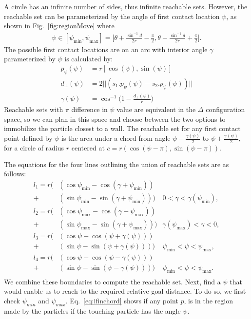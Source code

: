 A circle has an infinite number of sides, thus infinite reachable sets. However, the reachable set can be parameterized by the angle of first contact location $\psi$, as shown in Fig.~\ref{fig:regionMove} where 
\begin{align}
 \psi \in [\psi_{\min}, \psi_{\max}]= \Big[\theta +\frac{\sin^{-1}{d}}{2r} - \frac{\pi}{2}, \theta -\frac{\sin^{-1}{d}}{2r} + \frac{\pi}{2}\Big].
\end{align}
The possible first contact locations are on an arc with interior angle $\gamma$ parameterized by $\psi$ is calculated by:
\begin{align}\label{eq:ppsi}
p_\psi(\psi) &= r[\cos(\psi ), \sin(\psi )]\\ \label{eq:dprep}
d_\perp(\psi)&= 2 ||(s_1.p_\psi(\psi) - s_2.p_\psi(\psi))||\\ \label{eq:gamma}
\gamma(\psi) &= \cos^{-1} \Big(1-\frac{d_\perp(\psi)}{r} \Big) 
\end{align} 
Reachable sets with $\pi$ difference in $\psi$ value are equivalent in the  $\Delta$ configuration space, so we can plan in this space and choose between the two options to immobilize the particle closest to a wall. 
The reachable set for any first contact point defined by $\psi$ is the area under a chord from angle $\psi- \frac{\gamma(\psi)}{2}$ to $\psi+ \frac{\gamma(\psi)}{2}$, for a circle of radius $r$ centered at $c = r(\cos(\psi-\pi), \sin(\psi-\pi))$.

The equations for the four lines outlining the union of reachable sets are as follows:
\begin{align}\label{eq:circlereachable}
l_1 =  r \Big(&(\cos\psi_{\min}- \cos(\gamma + \psi_{\min}) )\\ \nonumber
 + &(\sin\psi_{\min}- \sin(\gamma + \psi_{\min}))\Big) &  0<\gamma< \gamma(\psi_{\min}),\\ \nonumber
l_2 =  r \Big(&(\cos\psi_{\max}- \cos(\gamma + \psi_{\max}))\\ \nonumber
 + &(\sin\psi_{\max}- \sin(\gamma + \psi_{\max}))\Big) &  \gamma(\psi_{\max})<\gamma< 0,\\  \nonumber
l_3 =  r \Big(&(\cos\psi- \cos( \psi+\gamma(\psi) ) )\\ \nonumber
+ &( \sin\psi-\sin( \psi+ \gamma(\psi)))\Big) &  \psi_{\min}<\psi< \psi_{\max},\\ \nonumber
l_4 =  r \Big(&(\cos\psi- \cos( \psi-\gamma(\psi) ))\\ \nonumber
+ & ( \sin\psi- \sin( \psi- \gamma(\psi)))\Big) &  \psi_{\min}<\psi< \psi_{\max}.\\ \nonumber
\end{align}
We combine these boundaries to compute the reachable set. 
Next, find a $\psi$ that would enable us to reach to the required relative goal distance. To do so, we first check $\psi_{min}$ and $\psi_{max}$. Eq.~\eqref{eq:ifinchord} shows if any point $p$, is in the region made by the particles if the touching particle has the angle $\psi$.

